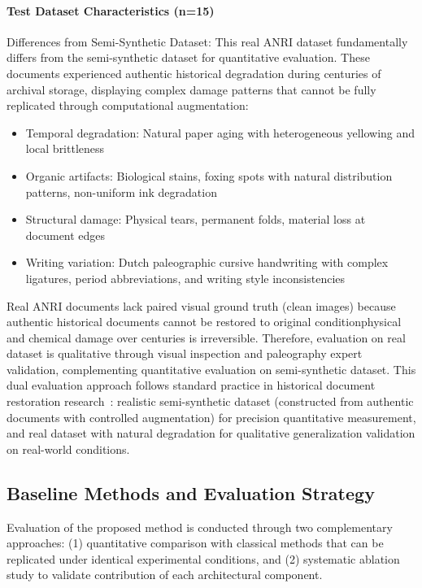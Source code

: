 \documentclass[journal]{IEEEtran}
\begin{document}
\paragraph{Test Dataset Characteristics (n=15)}
Differences from Semi-Synthetic Dataset: This real ANRI dataset fundamentally differs from the semi-synthetic dataset for quantitative evaluation. These documents experienced authentic historical degradation during centuries of archival storage, displaying complex damage patterns that cannot be fully replicated through computational augmentation:
\begin{itemize}
    \item Temporal degradation: Natural paper aging with heterogeneous yellowing and local brittleness
    \item Organic artifacts: Biological stains, foxing spots with natural distribution patterns, non-uniform ink degradation
    \item Structural damage: Physical tears, permanent folds, material loss at document edges
    \item Writing variation: Dutch paleographic cursive handwriting with complex ligatures, period abbreviations, and writing style inconsistencies
\end{itemize}

Real ANRI documents lack paired visual ground truth (clean images) because authentic historical documents cannot be restored to original condition\textemdash physical and chemical damage over centuries is irreversible. Therefore, evaluation on real dataset is qualitative through visual inspection and paleography expert validation, complementing quantitative evaluation on semi-synthetic dataset. This dual evaluation approach follows standard practice in historical document restoration research~\cite{souibgui2021enhance,souibgui2020degan}: realistic semi-synthetic dataset (constructed from authentic documents with controlled augmentation) for precision quantitative measurement, and real dataset with natural degradation for qualitative generalization validation on real-world conditions.

\subsection{Baseline Methods and Evaluation Strategy}

Evaluation of the proposed method is conducted through two complementary approaches: (1) quantitative comparison with classical methods that can be replicated under identical experimental conditions, and (2) systematic ablation study to validate contribution of each architectural component.
\end{document}
